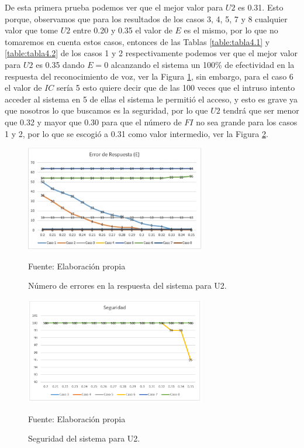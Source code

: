 De esta primera prueba podemos ver que el mejor valor para $U2$ es 0.31. Esto porque, observamos que para los resultados de los casos 3, 4, 5, 7 y 8 cualquier valor que tome $U2$ entre 0.20 y 0.35 el valor de $E$ es el mismo, por lo que no tomaremos en cuenta estos casos, entonces de las Tablas \ref{table:tabla4.1} y \ref{table:tabla4.2} de los casos 1 y 2 respectivamente podemos ver que el mejor valor para $U2$ es 0.35 dando $E = 0$ alcanzando el sistema un 100\% de efectividad en la respuesta del reconocimiento de voz, ver la Figura \ref{fig:figura4.1}, sin embargo, para el caso 6 el valor de $IC$ sería 5 esto quiere decir que de las 100 veces que el intruso intento acceder al sistema en 5 de ellas el sistema le permitió el acceso, y esto es grave ya que nosotros lo que buscamos es la seguridad, por lo que $U2$ tendrá que ser menor que 0.32 y mayor que 0.30 para que el número de $FI$ no sea grande para los casos 1 y 2, por lo que se escogió a 0.31 como valor intermedio, ver la Figura \ref{fig:figura4.2}.

\begin{figure}[H]
\begin{center}
\includegraphics[width=0.7\textwidth]{Imagenes/Cap4/image001}
\end{center}
\begin{center}
\vskip -0.5cm
\caption{\small{Número de errores en la respuesta del sistema para U2.}}
\label{fig:figura4.1}
{\small{Fuente: Elaboración propia}}
\end{center}
\end{figure}

\begin{figure}[H]
\begin{center}
\includegraphics[width=0.7\textwidth]{Imagenes/Cap4/image002}
\end{center}
\begin{center}
\vskip -0.5cm
\caption{\small{Seguridad del sistema para U2.}}
\label{fig:figura4.2}
{\small{Fuente: Elaboración propia}}
\end{center}
\end{figure}

